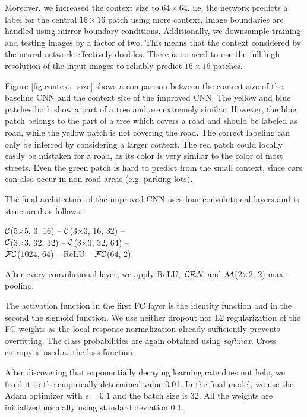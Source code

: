 \documentclass[10pt,conference,compsocconf]{IEEEtran}
\newcommand{\conv}[3]{$ \cal{C} $(#1$ \times  $#1, #2, #3)}
\newcommand{\maxpool}[2]{$ \cal{M} $(#1$ \times $#1, #2)}
\newcommand{\lrn}{$ \cal{LRN}~$}
\newcommand{\fc}[2]{$ \cal{FC} $(#1, #2)}
\begin{document}
Moreover, we increased the context size to $ 64\times64 $, i.e. the network predicts a label for the central $ 16\times16 $ patch using more context. Image boundaries are handled using mirror boundary conditions. Additionally, we downsample training and testing images by a factor of two. This means that the context considered by the neural network effectively doubles. There is no need to use the full high resolution of the input images to reliably predict $ 16 \times 16 $ patches.

\par
Figure \ref{fig:context_size} shows a comparison between the context size of the baseline CNN and the context size of the improved CNN. The yellow and blue patches both show a part of a tree and are extremely similar. However, the blue patch belongs to the part of a tree which covers a road and should be labeled as road, while the yellow patch is not covering the road. The correct labeling can only be inferred by considering a larger context. The red patch could locally easily be mistaken for a road, as its color is very similar to the color of most streets. Even the green patch is hard to predict from the small context, since cars can also occur in non-road areas (e.g. parking lots).

\par
The final architecture of the improved CNN uses four convolutional layers and is structured as follows:
\begin{center}
	\conv{5}{3}{16} -- \conv{3}{16}{32} -- \\ 
	\conv{3}{32}{32} -- \conv{3}{32}{64} -- \\
	\fc{1024}{64} -- ReLU -- \fc{64}{2}.
\end{center}
After every convolutional layer, we apply ReLU, \lrn and \maxpool{2}{2} max-pooling.

The activation function in the first FC layer is the identity function and in the second the sigmoid function. We use neither dropout nor L2 regularization of the FC weights as the local response normalization already sufficiently prevents overfitting. The class probabilities are again obtained using \textit{softmax}. Cross entropy is used as the loss function.

After discovering that exponentially decaying learning rate does not help, we fixed it to the empirically determined value 0.01. 
In the final model, we use the Adam optimizer \cite{Adam.2014} with $ \epsilon = 0.1 $ and the batch size is 32. All the weights are initialized normally using standard deviation 0.1.
\end{document}
